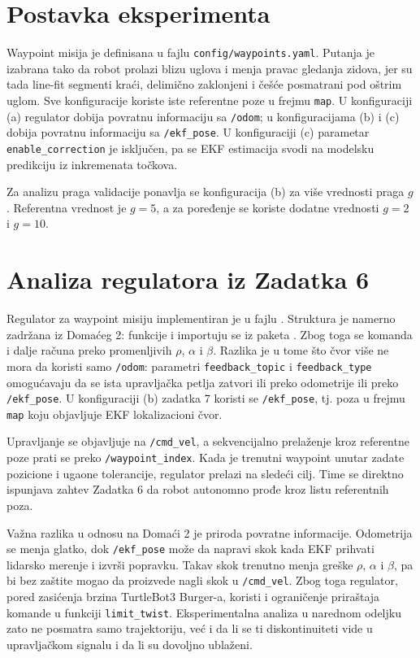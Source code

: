 \documentclass[a4paper,12pt]{article}
\begin{document}
\section{Postavka eksperimenta}

Waypoint misija je definisana u fajlu \texttt{config/waypoints.yaml}. Putanja je izabrana tako da robot prolazi blizu uglova i menja pravac gledanja zidova, jer su tada line-fit segmenti kraći, delimično zaklonjeni i češće posmatrani pod oštrim uglom. Sve konfiguracije koriste iste referentne poze u frejmu \texttt{map}. U konfiguraciji (a) regulator dobija povratnu informaciju sa \texttt{/odom}; u konfiguracijama (b) i (c) dobija povratnu informaciju sa \texttt{/ekf\_pose}. U konfiguraciji (c) parametar \texttt{enable\_correction} je isključen, pa se EKF estimacija svodi na modelsku predikciju iz inkremenata točkova.

Za analizu praga validacije ponavlja se konfiguracija (b) za više vrednosti praga $g$. Referentna vrednost je $g=5$, a za poređenje se koriste dodatne vrednosti $g=2$ i $g=10$.

\section{Analiza regulatora iz Zadatka 6}

Regulator za waypoint misiju implementiran je u fajlu . Struktura je namerno zadržana iz Domaćeg 2: funkcije  i  importuju se iz paketa . Zbog toga se komanda i dalje računa preko promenljivih $\rho$, $\alpha$ i $\beta$. Razlika je u tome što čvor više ne mora da koristi samo \texttt{/odom}: parametri \texttt{feedback\_topic} i \texttt{feedback\_type} omogućavaju da se ista upravljačka petlja zatvori ili preko odometrije ili preko \texttt{/ekf\_pose}. U konfiguraciji (b) zadatka 7 koristi se \texttt{/ekf\_pose}, tj. poza u frejmu \texttt{map} koju objavljuje EKF lokalizacioni čvor.

Upravljanje se objavljuje na \texttt{/cmd\_vel}, a sekvencijalno prelaženje kroz referentne poze prati se preko \texttt{/waypoint\_index}. Kada je trenutni waypoint unutar zadate pozicione i ugaone tolerancije, regulator prelazi na sledeći cilj. Time se direktno ispunjava zahtev Zadatka 6 da robot autonomno prođe kroz listu referentnih poza.

Važna razlika u odnosu na Domaći 2 je priroda povratne informacije. Odometrija se menja glatko, dok \texttt{/ekf\_pose} može da napravi skok kada EKF prihvati lidarsko merenje i izvrši popravku. Takav skok trenutno menja greške $\rho$, $\alpha$ i $\beta$, pa bi bez zaštite mogao da proizvede nagli skok u \texttt{/cmd\_vel}. Zbog toga regulator, pored zasićenja brzina TurtleBot3 Burger-a, koristi i ograničenje priraštaja komande u funkciji \texttt{limit\_twist}. Eksperimentalna analiza u narednom odeljku zato ne posmatra samo trajektoriju, već i da li se ti diskontinuiteti vide u upravljačkom signalu i da li su dovoljno ublaženi.
\end{document}
